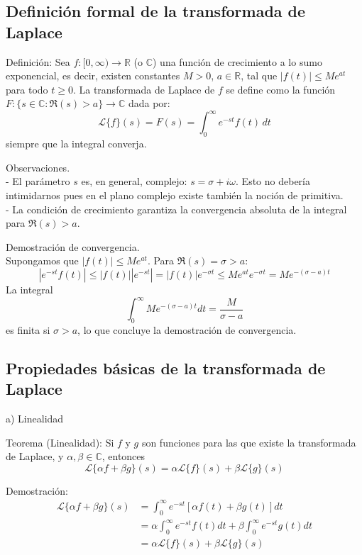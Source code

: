 \documentclass{article}
\theoremstyle{nonumberplain}
\begin{document}
\subsection{Definición formal de la transformada de Laplace}

Definición:  
Sea \( f: [0, \infty) \to \mathbb{R} \) (o \(\mathbb{C}\)) una función de crecimiento a lo sumo exponencial, es decir, existen constantes \( M > 0 \), \( a \in \mathbb{R} \), tal que \( |f(t)| \leq M e^{a t} \) para todo \( t \geq 0 \).  
La transformada de Laplace de \( f \) se define como la función \( F: \{s \in \mathbb{C}: \Re(s) > a\} \to \mathbb{C} \) dada por:
\[
\mathcal{L}\{f\}(s) = F(s) = \int_{0}^{\infty} e^{-s t} f(t)\, dt
\]
siempre que la integral converja.

Observaciones. \\
- El parámetro \( s \) es, en general, complejo: \( s = \sigma + i \omega \). Esto no debería intimidarnos pues en el plano complejo existe también la noción de primitiva. \\
- La condición de crecimiento garantiza la convergencia absoluta de la integral para \( \Re(s) > a \).

Demostración de convergencia. \\  
Supongamos que \( |f(t)| \leq M e^{a t} \). Para \( \Re(s) = \sigma > a \):
\[
|e^{-s t} f(t)| \leq |f(t)| |e^{-s t}| = |f(t)| e^{-\sigma t} \leq M e^{a t} e^{-\sigma t} = M e^{-(\sigma - a)t}
\]
La integral
\[
\int_0^{\infty} M e^{-(\sigma - a)t} dt = \frac{M}{\sigma - a}
\]
es finita si \( \sigma > a \), lo que concluye la demostración de convergencia.


\subsection{Propiedades básicas de la transformada de Laplace}

 a) Linealidad

Teorema (Linealidad):  
Si \( f \) y \( g \) son funciones para las que existe la transformada de Laplace, y \( \alpha, \beta \in \mathbb{C} \), entonces
\[
\mathcal{L}\{\alpha f + \beta g\}(s) = \alpha \mathcal{L}\{f\}(s) + \beta \mathcal{L}\{g\}(s)
\]

Demostración:  
\[
\begin{align}
\mathcal{L}\{\alpha f + \beta g\}(s) &= \int_{0}^{\infty} e^{-s t} [\alpha f(t) + \beta g(t)] dt \\
&= \alpha \int_{0}^{\infty} e^{-s t} f(t) dt + \beta \int_{0}^{\infty} e^{-s t} g(t) dt \\
&= \alpha \mathcal{L}\{f\}(s) + \beta \mathcal{L}\{g\}(s)
\end{align}
\]
\end{document}
